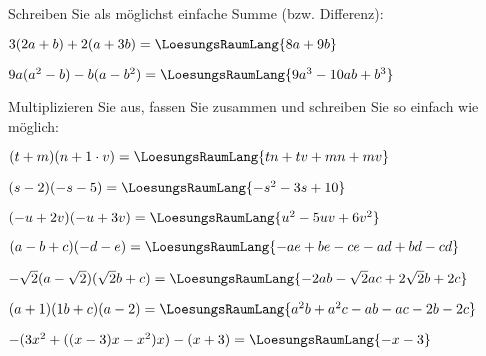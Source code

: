 
Schreiben Sie als möglichst einfache Summe (bzw. Differenz):
\begin{bbwAufgabenBlock}
\item $3(2a+b) + 2(a+3b)=\LoesungsRaumLang{8a+9b}$
\item $9a(a^2-b)-b(a-b^2) = \LoesungsRaumLang{9a^3 - 10ab + b^3}$
\end{bbwAufgabenBlock}
\newpage


Multiplizieren Sie aus, fassen Sie zusammen und schreiben Sie so
einfach wie möglich:
\begin{bbwAufgabenBlock}
\item $(t+m)(n+1\cdot{}v)=\LoesungsRaumLang{tn+tv+mn+mv}$
\item $(s-2)(-s-5) =\LoesungsRaumLang{-s^2-3s+10}$
\item $(-u+2v)(-u+3v) = \LoesungsRaumLang{u^2-5uv +6v^2}$
\item $(a-b+c)(-d-e)=\LoesungsRaumLang{-ae+be-ce-ad+bd-cd}$\newpage
\item $-\sqrt{2}(a-\sqrt{2})(\sqrt{2}b + c) =\LoesungsRaumLang{-2ab- \sqrt{2}ac + 2\sqrt{2}b +2c}$
\item $(a+1)(1b+c)(a-2) = \LoesungsRaumLang{a^2b+a^2c-ab-ac-2b-2c}$
\item $-(3x^2+((x-3)x-x^2)x)-(x+3) = \LoesungsRaumLang{-x-3}$
\end{bbwAufgabenBlock} 


